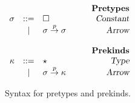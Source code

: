 \begin{figure}

\begin{center}
\begin{math}
\begin{array}{rclr}
&&&\qquad\textsl{\bf Pretypes}\\
\sigma

&::=& 
\square
&\qquad\textsl{Constant} 
\\

&|& 
\sigma \stackrel{p}{\rightarrow} \sigma
&\qquad\textsl{Arrow}
\\
\\
&&&\qquad\textsl{\bf Prekinds}\\
\kappa

&::=& 
\star
&\qquad\textsl{Type} 
\\

&|& 
\sigma \stackrel{p}{\rightarrow} \kappa
&\qquad\textsl{Arrow}
\\
\end{array}
\end{math}
\end{center}
\caption{Syntax for pretypes and prekinds.}
\end{figure}
